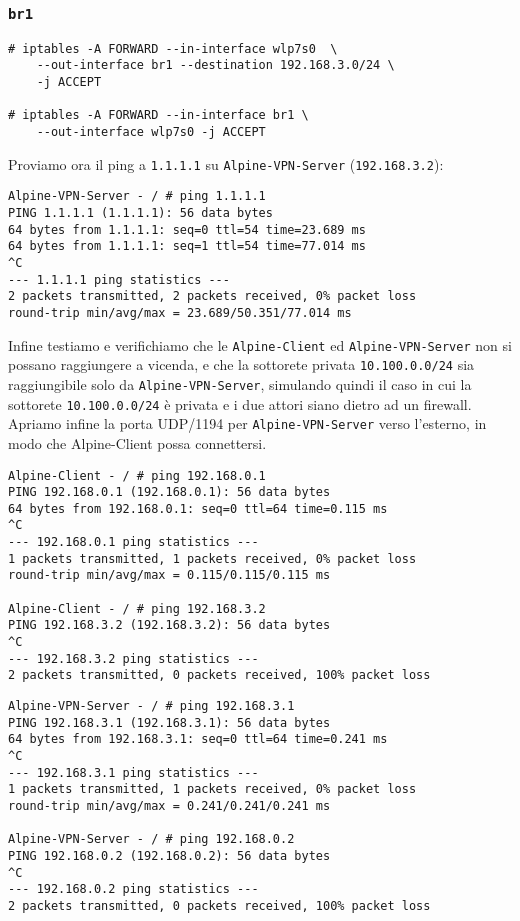 \documentclass{article}
\newcommand{\interface}[1]{{\lstinline[basicstyle=\ttfamily\color{brown}]|#1|}}
\newcommand{\ipaddress}[1]{{\lstinline[basicstyle=\ttfamily\color{purple}]|#1|}}
\newcommand{\hostname}[1]{{\lstinline[basicstyle=\ttfamily\color{teal}]|#1|}}
\begin{document}
\subsubsection{\interface{br1}}
\begin{lstlisting}
# iptables -A FORWARD --in-interface wlp7s0  \
    --out-interface br1 --destination 192.168.3.0/24 \
    -j ACCEPT

# iptables -A FORWARD --in-interface br1 \
    --out-interface wlp7s0 -j ACCEPT
\end{lstlisting}
\vspace{1em}
Proviamo ora il ping a \ipaddress{1.1.1.1} su \hostname{Alpine-VPN-Server} (\ipaddress{192.168.3.2}):
\begin{lstlisting}
Alpine-VPN-Server - / # ping 1.1.1.1
PING 1.1.1.1 (1.1.1.1): 56 data bytes
64 bytes from 1.1.1.1: seq=0 ttl=54 time=23.689 ms
64 bytes from 1.1.1.1: seq=1 ttl=54 time=77.014 ms
^C
--- 1.1.1.1 ping statistics ---
2 packets transmitted, 2 packets received, 0% packet loss
round-trip min/avg/max = 23.689/50.351/77.014 ms
\end{lstlisting}
\vspace{1em}
Infine testiamo e verifichiamo che le \hostname{Alpine-Client} ed \hostname{Alpine-VPN-Server} non si possano raggiungere a vicenda,
e che la sottorete privata \ipaddress{10.100.0.0/24} sia raggiungibile solo da \hostname{Alpine-VPN-Server}, simulando quindi il
caso in cui la sottorete \ipaddress{10.100.0.0/24} è privata e i due attori siano dietro ad un firewall.
Apriamo infine la porta UDP/1194 per \hostname{Alpine-VPN-Server} verso l'esterno, in modo che Alpine-Client possa connettersi.


\begin{lstlisting}
Alpine-Client - / # ping 192.168.0.1
PING 192.168.0.1 (192.168.0.1): 56 data bytes
64 bytes from 192.168.0.1: seq=0 ttl=64 time=0.115 ms
^C
--- 192.168.0.1 ping statistics ---
1 packets transmitted, 1 packets received, 0% packet loss
round-trip min/avg/max = 0.115/0.115/0.115 ms

Alpine-Client - / # ping 192.168.3.2
PING 192.168.3.2 (192.168.3.2): 56 data bytes
^C
--- 192.168.3.2 ping statistics ---
2 packets transmitted, 0 packets received, 100% packet loss
\end{lstlisting}

\begin{lstlisting}
Alpine-VPN-Server - / # ping 192.168.3.1
PING 192.168.3.1 (192.168.3.1): 56 data bytes
64 bytes from 192.168.3.1: seq=0 ttl=64 time=0.241 ms
^C
--- 192.168.3.1 ping statistics ---
1 packets transmitted, 1 packets received, 0% packet loss
round-trip min/avg/max = 0.241/0.241/0.241 ms

Alpine-VPN-Server - / # ping 192.168.0.2
PING 192.168.0.2 (192.168.0.2): 56 data bytes
^C
--- 192.168.0.2 ping statistics ---
2 packets transmitted, 0 packets received, 100% packet loss
\end{lstlisting}
\vspace{1em}
\end{document}
